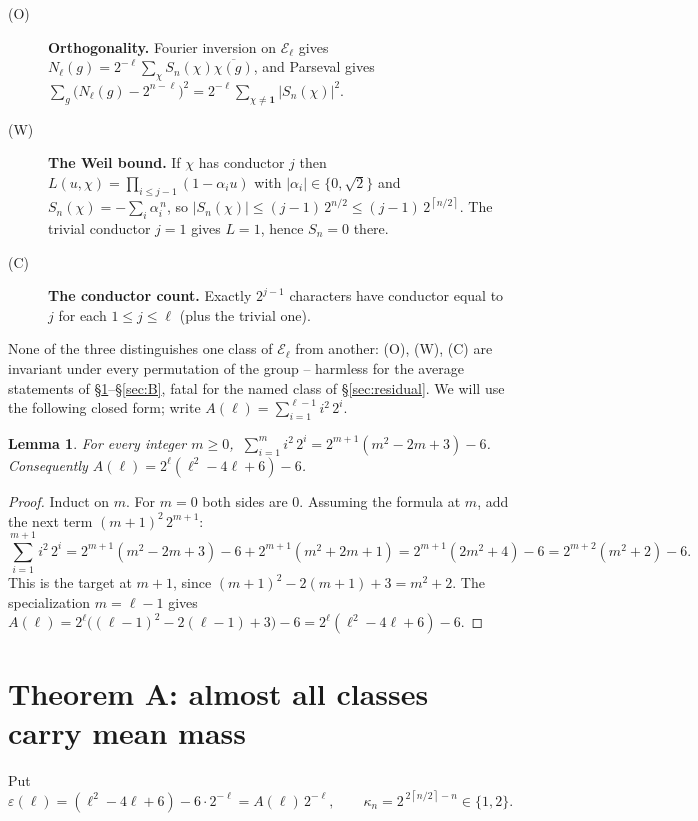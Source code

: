 \documentclass[10pt]{article}
\theoremstyle{plain}
\newtheorem{lemma}{Lemma}
\newcommand{\E}{\mathcal E}
\newcommand{\ceil}[1]{\left\lceil #1\right\rceil}
\newcommand{\one}{\mathbf 1}
\begin{document}
\begin{description}
\item[(O)] \textbf{Orthogonality.} Fourier inversion on $\E_\ell$ gives
  $N_\ell(g)=2^{-\ell}\sum_\chi S_n(\chi)\overline{\chi(g)}$, and Parseval
  gives $\sum_g\bigl(N_\ell(g)-2^{n-\ell}\bigr)^2
  =2^{-\ell}\sum_{\chi\neq\one}|S_n(\chi)|^2$.
\item[(W)] \textbf{The Weil bound.} If $\chi$ has conductor $j$ then
  $L(u,\chi)=\prod_{i\le j-1}(1-\alpha_i u)$ with $|\alpha_i|\in\{0,\sqrt2\}$
  and $S_n(\chi)=-\sum_i\alpha_i^{\,n}$, so
  $|S_n(\chi)|\le(j-1)\,2^{n/2}\le(j-1)\,2^{\ceil{n/2}}$. The trivial
  conductor $j=1$ gives $L=1$, hence $S_n=0$ there.
\item[(C)] \textbf{The conductor count.} Exactly $2^{j-1}$ characters have
  conductor equal to $j$ for each $1\le j\le\ell$ (plus the trivial one).
\end{description}

None of the three distinguishes one class of $\E_\ell$ from another: (O), (W),
(C) are invariant under every permutation of the group -- harmless for the
average statements of \S\ref{sec:A}--\S\ref{sec:B}, fatal for the named class
of \S\ref{sec:residual}. We will use the following closed form; write
$A(\ell)=\sum_{i=1}^{\ell-1}i^2\,2^i$.

\begin{lemma}\label{lem:sum}
For every integer $m\ge0$,
$\ \sum_{i=1}^{m}i^2\,2^i=2^{m+1}(m^2-2m+3)-6$. Consequently
$A(\ell)=2^{\ell}(\ell^2-4\ell+6)-6$.
\end{lemma}

\begin{proof}
Induct on $m$. For $m=0$ both sides are $0$. Assuming the formula at $m$,
add the next term $(m+1)^2\,2^{m+1}$:
\[
 \sum_{i=1}^{m+1}i^2\,2^i
 =2^{m+1}(m^2-2m+3)-6+2^{m+1}(m^2+2m+1)
 =2^{m+1}(2m^2+4)-6=2^{m+2}(m^2+2)-6.
\]
This is the target at $m+1$, since $(m+1)^2-2(m+1)+3=m^2+2$. The
specialization $m=\ell-1$ gives
$A(\ell)=2^{\ell}\bigl((\ell-1)^2-2(\ell-1)+3\bigr)-6=2^{\ell}(\ell^2-4\ell+6)-6$.
\end{proof}

\section{Theorem A: almost all classes carry mean mass}\label{sec:A}

Put
\[
 \varepsilon(\ell)=(\ell^2-4\ell+6)-6\cdot2^{-\ell}=A(\ell)\,2^{-\ell},
 \qquad
 \kappa_n=2^{\,2\ceil{n/2}-n}\in\{1,2\}.
\]
\end{document}
